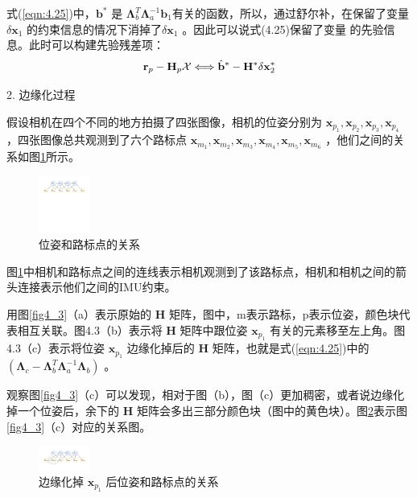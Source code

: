 式(\ref{eqn:4.25})中，$\mathbf{b}^{*} $ 是 $\bm{\Lambda}_{b}^{T} \bm{\Lambda}_{a}^{-1} \mathbf{b}_{1} $有关的函数，所以，通过舒尔补，在保留了变量 $\delta \mathbf{x}_1 $ 的约束信息的情况下消掉了$\delta \mathbf{x}_1 $ 。因此可以说式(4.25)保留了变量 的先验信息。此时可以构建先验残差项：
\begin{equation}
\label{eqn:4.26}
\setlength{\abovedisplayskip}{6pt}
\setlength{\belowdisplayskip}{6pt}
\mathbf{r}_p-\mathbf{H}_p\mathcal{X} \Longleftrightarrow 
\hat{\mathbf{b}}^{*} - \mathbf{H}^{*} \delta \mathbf{x}_{2}^{*}
\end{equation}

2. 边缘化过程

假设相机在四个不同的地方拍摄了四张图像，相机的位姿分别为 $ \mathbf{x}_{p_1},  \mathbf{x}_{p_2},  \mathbf{x}_{p_3},  \mathbf{x}_{p_4} $ ，四张图像总共观测到了六个路标点 $ \mathbf{x}_{m_1},  \mathbf{x}_{m_2}, \mathbf{x}_{m_3}, \mathbf{x}_{m_4}, \mathbf{x}_{m_5}, \mathbf{x}_{m_6}$ ，他们之间的关系如图\ref{fig4_2}所示。
\begin{figure}[h]\setlength{\belowcaptionskip}{-12pt}
	\centering
	\includegraphics[width=0.15\textwidth, angle=-90]{figures/chapter4/fig4_2}
	\caption{位姿和路标点的关系}\label{fig4_2}
\end{figure}
图\ref{fig4_2}中相机和路标点之间的连线表示相机观测到了该路标点，相机和相机之间的箭头连接表示他们之间的IMU约束。

用图\ref{fig4_3}（a）表示原始的 $\mathbf{H} $ 矩阵，图中，m表示路标，p表示位姿，颜色块代表相互关联。图4.3（b）表示将 $\mathbf{H} $ 矩阵中跟位姿 $\mathbf{x}_{p_1} $ 有关的元素移至左上角。图4.3（c）表示将位姿 $\mathbf{x}_{p_1} $ 边缘化掉后的 $\mathbf{H} $ 矩阵，也就是式(\ref{eqn:4.25})中的$\left( \bm{\Lambda}_{c}-\bm{\Lambda}_{b}^{T} \bm{\Lambda}_{a}^{-1} \bm{\Lambda}_{b}\right) $ 。

观察图\ref{fig4_3}（c）可以发现，相对于图（b），图（c）更加稠密，或者说边缘化掉一个位姿后，余下的 $\mathbf{H} $ 矩阵会多出三部分颜色块（图中的黄色块）。图\ref{fig4_4}表示图\ref{fig4_3}（c）对应的关系图。
\begin{figure}[h]\setlength{\belowcaptionskip}{-12pt}
	\centering
	\includegraphics[width=0.15\textwidth, angle=-90]{figures/chapter4/fig4_4}
	\caption{边缘化掉 $\mathbf{x}_{p_1} $ 后位姿和路标点的关系}\label{fig4_4}
\end{figure}

